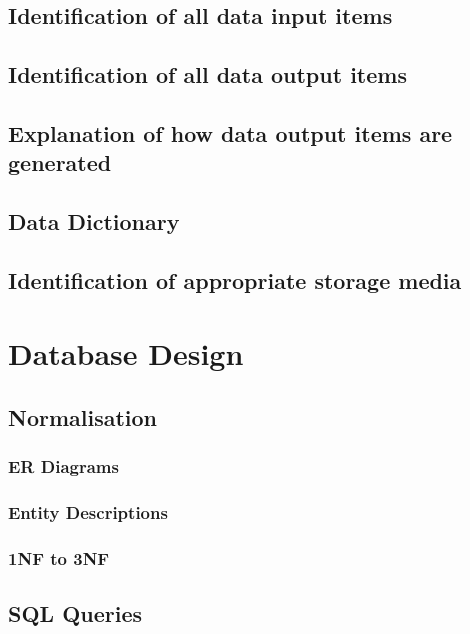 \begin{itemize}
\subsection{Identification of all data input items}

\subsection{Identification of all data output items}

\subsection{Explanation of how data output items are generated}

\subsection{Data Dictionary}

\subsection{Identification of appropriate storage media}

\section{Database Design}

\subsection{Normalisation}

\subsubsection{ER Diagrams}

\subsubsection{Entity Descriptions}

\subsubsection{1NF to 3NF}

\subsection{SQL Queries}


\end{itemize}
